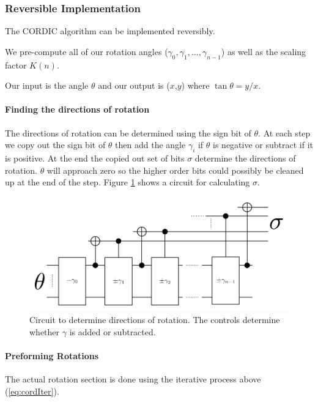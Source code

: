    \subsubsection{Reversible Implementation}
        The CORDIC algorithm can be implemented reversibly.

        We pre-compute all of our rotation angles ($\gamma_0,\gamma_1,\dotsc,\gamma_{n-1}$) as well as the scaling factor $K(n)$.

        Our input is the angle $\theta$ and our output is ($x$,$y$) where $\tan\theta = y/x$.

        \paragraph{Finding the directions of rotation}
            The directions of rotation can be determined using the sign bit of $\theta$.  
            At each step we copy out the sign bit of $\theta$ then add the angle $\gamma_i$ if $\theta$ is negative or subtract if it is positive.
            At the end the copied out set of bits $\sigma$ determine the directions of rotation.
            $\theta$ will approach zero so the higher order bits could possibly be cleaned up at the end of the step.
            Figure \ref{fig:CORDICDirections} shows a circuit for calculating $\sigma$.
            \begin{figure}[p]
                \capstart
                \centering
                \includegraphics[width=\textwidth]{images/CORDICDirections} 
                \caption{Circuit to determine directions of rotation.  The controls determine whether $\gamma$ is added or subtracted.}
                \label{fig:CORDICDirections}
            \end{figure}

        \paragraph{Preforming Rotations}
            The actual rotation section is done using the iterative process above (\ref{eq:cordIter}).


